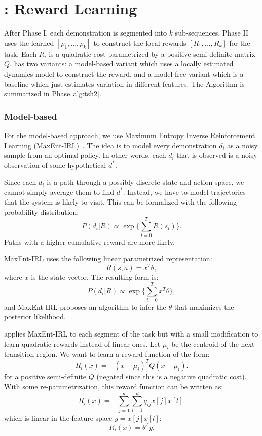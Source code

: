 \section*{\hirl: Reward Learning}\label{sec:reward}
After Phase I, each demonstration is segmented into $k$ sub-sequences.
Phase II uses the learned $[\rho_1,...,\rho_k]$ to construct the local rewards $[R_1,...,R_k]$ for the task.
Each $R_i$ is a quadratic cost parametrized by a positive semi-definite matrix $Q$.
\hirl has two variants: a model-based variant which uses a locally estimated dynamics model to construct the reward, and a model-free variant which is a baseline which just estimates variation in different features.
The Algorithm is summarized in Phase\,\ref{alg:tsh2}.


\subsubsection{Model-based}
For the model-based approach, we use Maximum Entropy Inverse Reinforcement Learning (MaxEnt-IRL)~\cite{DBLP:conf/aaai/ZiebartMBD08}. 
The idea is to model every demonstration $d_i$ as a noisy sample from an optimal policy.
In other words, each $d_i$ that is observed is a noisy observation of some hypothetical $d^*$.

Since each $d_i$ is a path through a possibly discrete state and action space, we cannot simply average them to find $d^*$.
Instead, we have to model trajectories that the system is likely to visit. 
This can be formalized with the following probability distribution:
\[
P(d_i | R) \propto \exp \{ \sum_{t=0}^T R(s_t) \}.
\]
Paths with a higher cumulative reward are more likely.

MaxEnt-IRL uses the following linear parametrized representation:
\[
R(s,a) = x^T \theta,
\]
where $x$ is the state vector. The resulting form is:
\[
P(d_i | R) \propto \exp \{ \sum_{t=0}^T x^T \theta \},
\]
and MaxEnt-IRL proposes an algorithm to infer the $\theta$ that maximizes the posterior likelihood.

\hirl applies MaxEnt-IRL to each segment of the task but with a small modification to learn quadratic rewards instead of linear ones. 
Let $\mu_i$ be the centroid of the next transition region.
We want to learn a reward function of the form:
\[
R_i(x) = -(x-\mu_i)^T Q (x-\mu_i).
\]
for a positive semi-definite $Q$ (negated since this is a negative quadratic cost).
With some re-parametrization, this reward function can be written as:
\[
R_i(x) = -\sum_{j=1}^d \sum_{l=1}^d q_{ij} x[j] x[l].
\]
which is linear in the feature-space $y = x[j] x[l]$:
\[
R_i(x) = \theta^T y.
\]

